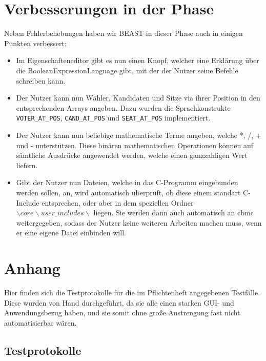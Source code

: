 \documentclass[a4paper]{scrreprt}
\begin{document}
\chapter{Verbesserungen in der Phase}
Neben Fehlerbehebungen haben wir BEAST in dieser Phase auch in einigen Punkten
verbessert:

\begin{itemize}
  \item Im Eigenschafteneditor gibt es nun einen Knopf, welcher eine Erklärung
  über die BooleanExpressionLanguage gibt, mit der der Nutzer seine Befehle
  schreiben kann.
  \item Der Nutzer kann nun Wähler, Kandidaten und Sitze via ihrer Position in den entsprechenden Arrays angeben. Dazu wurden die Sprachkonstrukte \verb!VOTER_AT_POS!, \verb!CAND_AT_POS! und \verb!SEAT_AT_POS! implementiert.
  \item Der Nutzer kann nun beliebige mathematische Terme angeben, welche *, /, + und - unterstützen. Diese binären mathematischen Operationen können auf sämtliche Ausdrücke angewendet werden, welche einen ganzzahligen Wert liefern.
  \item Gibt der Nutzer nun Dateien, welche in das C-Programm eingebunden werden
  sollen, an, wird automatisch überprüft, ob diese einem standart C-Include
  entsprechen, oder aber in dem speziellen Ordner $\backslash core \backslash
  user\_includes \backslash$ liegen. Sie werden dann auch automatisch an cbmc
  weitergegeben, sodass der Nutzer keine weiteren Arbeiten machen muss, wenn er
  eine eigene Datei einbinden will.
\end{itemize}

\chapter{Anhang}

Hier finden sich die Testprotokolle für die im Pflichtenheft angegebenen
Testfälle. Diese wurden von Hand durchgeführt, da sie alle einen starken GUI- und
Anwendungsbezug haben, und sie somit ohne große Anstrengung fast nicht
automatisierbar wären.

\section{Testprotokolle} 















\end{document}
